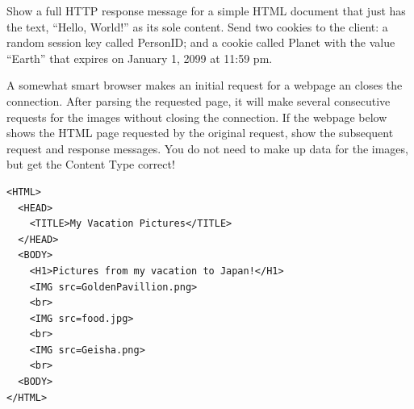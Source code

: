 \documentclass[12pt,addpoints,answers]{exam}
\begin{document}
\begin{questions}
\question[8] Show a full HTTP response message for a simple HTML document that just has the text, ``Hello, World!'' as its sole content. Send two cookies to the client: a random session key called PersonID; and a cookie called Planet with the value ``Earth'' that expires on January 1, 2099 at 11:59 pm.
\begin{solution}
\end{solution}

\question[12] A somewhat smart browser makes an initial request for a webpage an closes the connection. After parsing the requested page, it will make several consecutive requests for the images without closing the connection. If the webpage below shows the HTML page requested by the original request, show the subsequent request and response messages. You do not need to make up data for the images, but get the Content Type correct!\\
\begin{minipage}{\textwidth}
\begin{lstlisting}[language={},escapechar=§,basicstyle=\ttfamily,breaklines=true]
<HTML>
  <HEAD>
    <TITLE>My Vacation Pictures</TITLE>
  </HEAD>
  <BODY>
    <H1>Pictures from my vacation to Japan!</H1>
    <IMG src=GoldenPavillion.png>
    <br>
    <IMG src=food.jpg>
    <br>
    <IMG src=Geisha.png>
    <br>
  <BODY>
</HTML>
\end{lstlisting}
\end{minipage}

\begin{solution}
\end{solution}

\end{questions}
\end{document}
